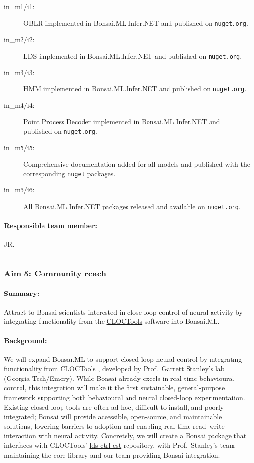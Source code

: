 \begin{description}
    \item[in\_m1/i1:] OBLR implemented in Bonsai.ML.Infer.NET and published on \texttt{nuget.org}.  
    \item[in\_m2/i2:] LDS implemented in Bonsai.ML.Infer.NET and published on \texttt{nuget.org}.  
    \item[in\_m3/i3:] HMM implemented in Bonsai.ML.Infer.NET and published on \texttt{nuget.org}.  
    \item[in\_m4/i4:] Point Process Decoder implemented in Bonsai.ML.Infer.NET and published on \texttt{nuget.org}.  
    \item[in\_m5/i5:] Comprehensive documentation added for all models and published with the corresponding \texttt{nuget} packages.  
    \item[in\_m6/i6:] All Bonsai.ML.Infer.NET packages released and available on \texttt{nuget.org}.  
\end{description}

\paragraph{Responsible team member:} JR.

\noindent\rule{\textwidth}{1pt}
\subsubsection{Aim 5: Community reach}

\paragraph{Summary:} Attract to Bonsai scientists interested in close-loop
control of neural activity by integrating functionality from
the \href{https://cloctools.github.io/}{CLOCTools} software into Bonsai.ML.

\paragraph{Background:} We will expand Bonsai.ML to support closed-loop neural
control by integrating functionality from
\href{https://cloctools.github.io/}{CLOCTools} , developed by Prof.~Garrett
Stanley’s lab (Georgia Tech/Emory). While Bonsai already excels in real-time
behavioural control, this integration will make it the first sustainable,
general-purpose framework supporting both behavioural and neural closed-loop
experimentation. Existing closed-loop tools are often ad hoc, difficult to
install, and poorly integrated; Bonsai will provide accessible, open-source,
and maintainable solutions, lowering barriers to adoption and enabling
real-time read–write interaction with neural activity.  Concretely, we will
create a Bonsai package that interfaces with CLOCTools’
\href{https://github.com/CLOCTools/lds-ctrl-est}{lds-ctrl-est} repository, with
Prof.~Stanley’s team maintaining the core library and our team providing Bonsai
integration.

